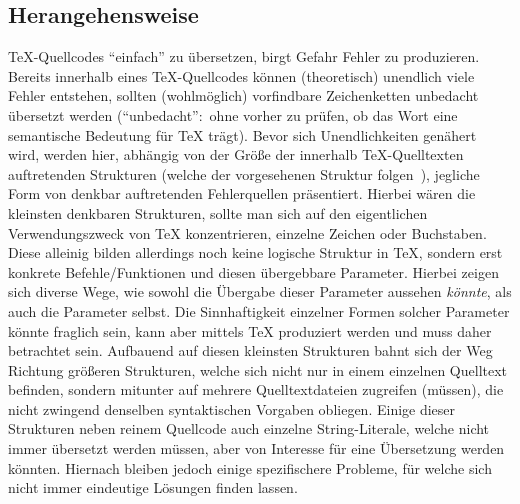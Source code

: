 \subsection{Herangehensweise}
\TeX{}-Quellcodes \enquote{einfach} zu übersetzen, birgt Gefahr Fehler zu produzieren. Bereits innerhalb eines \TeX{}-Quellcodes können (theoretisch) unendlich viele Fehler entstehen, sollten (wohlmöglich) vorfindbare Zeichenketten unbedacht übersetzt werden (\enquote{unbedacht}:\ ohne vorher zu prüfen, ob das Wort eine semantische Bedeutung für \TeX{} trägt). Bevor sich Unendlichkeiten genähert wird, werden hier, abhängig von der Größe der innerhalb \TeX{}-Quelltexten auftretenden Strukturen (welche der vorgesehenen Struktur folgen~\cite{texbook}), jegliche Form von denkbar auftretenden Fehlerquellen präsentiert. 
Hierbei wären die kleinsten denkbaren Strukturen, sollte man sich auf den eigentlichen Verwendungszweck von \TeX{} konzentrieren, einzelne Zeichen oder Buchstaben. Diese alleinig bilden allerdings noch keine logische Struktur in \TeX{}, sondern erst konkrete Befehle/Funktionen und diesen übergebbare Parameter. Hierbei zeigen sich diverse Wege, wie sowohl die Übergabe dieser Parameter aussehen \textit{könnte},%
als auch die Parameter selbst.%
Die Sinnhaftigkeit einzelner Formen solcher Parameter könnte fraglich sein, kann aber mittels \TeX{} produziert werden und muss daher betrachtet sein.%
Aufbauend auf diesen kleinsten Strukturen bahnt sich der Weg Richtung größeren Strukturen, welche sich nicht nur in einem einzelnen Quelltext befinden, sondern mitunter auf mehrere Quelltextdateien zugreifen (müssen), die nicht zwingend denselben syntaktischen Vorgaben obliegen.%
Einige dieser Strukturen neben reinem Quellcode auch einzelne String-Literale, welche nicht immer übersetzt werden müssen, aber von Interesse für eine Übersetzung werden könnten.%
Hiernach bleiben jedoch einige spezifischere Probleme, für welche sich nicht immer eindeutige Lösungen finden lassen.


